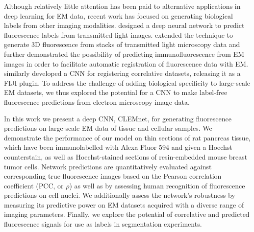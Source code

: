 Although relatively little attention has been paid to alternative applications in deep learning for EM data, recent work has focused on generating biological labels from other imaging modalities. \textcite{christiansen2018silico} designed a deep neural network to predict fluorescence labels from transmitted light images. \textcite{ounkomol2018label} extended the technique to generate 3D fluorescence from stacks of transmitted light microscopy data and further demonstrated the possibility of predicting immunofluorescence from EM images in order to facilitate automatic registration of fluorescence data with EM. \textcite{seifert2020deepclem} similarly developed a CNN for registering correlative datasets, releasing it as a FIJI plugin. To address the challenge of adding biological specificity to large-scale EM datasets, we thus explored the potential for a CNN to make label-free fluorescence predictions from electron microscopy image data.

In this work we present a deep CNN, CLEMnet, for generating fluorescence predictions on large-scale EM data of tissue and cellular samples. We demonstrate the performance of our model on thin sections of rat pancreas tissue, which have been immunolabelled with Alexa Fluor 594 and given a Hoechst counterstain, as well as Hoechst-stained sections of resin-embedded mouse breast tumor cells. Network predictions are quantitatively evaluated against corresponding true fluorescence images based on the Pearson correlation coefficient (PCC, or $\rho$) as well as by assessing human recognition of fluorescence predictions on cell nuclei. We additionally assess the network's robustness by measuring its predictive power on EM datasets acquired with a diverse range of imaging parameters. Finally, we explore the potential of correlative and predicted fluorescence signals for use as labels in segmentation experiments.
